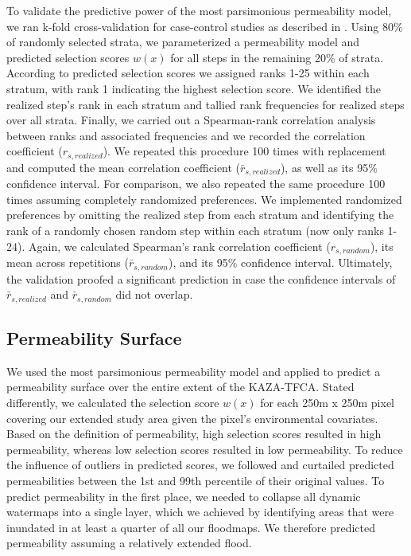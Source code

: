 \documentclass[abstract=on,10pt,a4paper,bibliography=totocnumbered]{scrartcl}
\begin{document}
To validate the predictive power of the most parsimonious permeability model, we
ran k-fold cross-validation for case-control studies as described in
\cite{Fortin.2009}. Using 80\% of randomly selected strata, we parameterized a
permeability model and predicted selection scores \(w(x)\) for all steps in the
remaining 20\% of strata. According to predicted selection scores we assigned
ranks 1-25 within each stratum, with rank 1 indicating the highest selection
score. We identified the realized step's rank in each stratum and tallied rank
frequencies for realized steps over all strata. Finally, we carried out a
Spearman-rank correlation analysis between ranks and associated frequencies and
we recorded the correlation coefficient (\(r_{s, realized}\)). We repeated this
procedure 100 times with replacement and computed the mean correlation
coefficient (\(\bar{r}_{s, realized}\)), as well as its 95\% confidence
interval. For comparison, we also repeated the same procedure 100 times assuming
completely randomized preferences. We implemented randomized preferences by
omitting the realized step from each stratum and identifying the rank of a
randomly chosen random step within each stratum (now only ranks 1-24). Again, we
calculated Spearman's rank correlation coefficient (\(r_{s, random}\)), its mean
across repetitions (\(\bar{r}_{s, random}\)), and its 95\% confidence interval.
Ultimately, the validation proofed a significant prediction in case the
confidence intervals of \(\bar{r}_{s, realized}\) and \(\bar{r}_{s, random}\)
did not overlap.

\subsection{Permeability Surface}
We used the most parsimonious permeability model and applied  to
predict a permeability surface over the entire extent of the KAZA-TFCA. Stated
differently, we calculated the selection score \(w(x)\) for each 250m x 250m
pixel covering our extended study area given the pixel's environmental
covariates. Based on the definition of permeability, high selection scores
resulted in high permeability, whereas low selection scores resulted in low
permeability. To reduce the influence of outliers in predicted scores, we
followed \cite{Squires.2013} and curtailed predicted permeabilities between the
1st and 99th percentile of their original values. To predict permeability in the
first place, we needed to collapse all dynamic watermaps into a single layer,
which we achieved by identifying areas that were inundated in at least a quarter
of all our floodmaps. We therefore predicted permeability assuming a relatively
extended flood.
\end{document}
